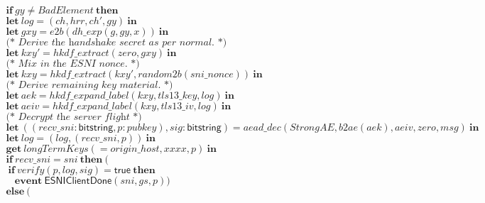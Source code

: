 \documentclass{article}
\theoremstyle{definition}
\newcommand{\kwl}[1]{\mathbf{#1}}
\newcommand{\kwc}[1]{\mathsf{#1}}
\newcommand{\kwt}[1]{\mathsf{#1}}
\newcommand{\kwe}[1]{\mathsf{#1}}
\newcommand{\var}[1]{\mathit{#1}}
\theoremstyle{definition}
\begin{document}
\begin{tabbing}
$ $\\
$\ \ \ \ \ \kwl{if}\ \var{gy}\neq\var{BadElement}\ \kwl{then} $\\
$\ \ \ \ \ \kwl{let}\ \var{log} = (\var{ch}, \var{hrr}, \var{ch'}, \var{gy})\ \kwl{in} $\\
$\ \ \ \ \ \kwl{let}\ \var{gxy} = \var{e2b}(\var{dh{\_}exp}(\var{g}, \var{gy}, \var{x}))\ \kwl{in} $\\
$ $\\
$\ \ \ \ \ \textit{(* Derive the handshake secret as per normal. *)} $\\
$\ \ \ \ \ \kwl{let}\ \var{kxy'} = \var{hkdf{\_}extract}(\var{zero}, \var{gxy})\ \kwl{in} $\\
$ $\\
$\ \ \ \ \ \textit{(* Mix in the ESNI nonce. *)} $\\
$\ \ \ \ \ \kwl{let}\ \var{kxy} = \var{hkdf{\_}extract}(\var{kxy'}, \var{random2b}(\var{sni{\_}nonce}))\ \kwl{in} $\\
$ $\\
$\ \ \ \ \ \textit{(* Derive remaining key material. *)} $\\
$\ \ \ \ \ \kwl{let}\ \var{aek} = \var{hkdf{\_}expand{\_}label}(\var{kxy}, \var{tls13{\_}key}, \var{log})\ \kwl{in} $\\
$\ \ \ \ \ \kwl{let}\ \var{aeiv} = \var{hkdf{\_}expand{\_}label}(\var{kxy}, \var{tls13{\_}iv}, \var{log})\ \kwl{in} $\\
$ $\\
$\ \ \ \ \ \textit{(* Decrypt the server flight *)} $\\
$\ \ \ \ \ \kwl{let}\ ((\var{recv{\_}sni}{:}\kwt{bitstring}, \var{p}{:}\var{pubkey}), \var{sig}{:}\kwt{bitstring}) = \var{aead{\_}dec}(\var{StrongAE}, \var{b2ae}(\var{aek}), \var{aeiv}, \var{zero}, \var{msg})\ \kwl{in} $\\
$\ \ \ \ \ \kwl{let}\ \var{log} = (\var{log}, (\var{recv{\_}sni}, \var{p}))\ \kwl{in} $\\
$ $\\
$\ \ \ \ \ \kwl{get}\ \var{longTermKeys}( = \var{origin{\_}host}, \var{xxxx}, \var{p})\ \kwl{in} $\\
$\ \ \ \ \ \kwl{if}\ \var{recv{\_}sni} = \var{sni}\ \kwl{then}\ ( $\\
$\ \ \ \ \ \ \kwl{if}\ \var{verify}(\var{p}, \var{log}, \var{sig}) = \kwc{true}\ \kwl{then} $\\
$\ \ \ \ \ \ \ \ \ \kwl{event}\ \kwe{ESNIClientDone}(\var{sni}, \var{gs}, \var{p})) $\\
$\ \ \ \ \ \kwl{else}\ ( $\\

\end{tabbing}
\end{document}
